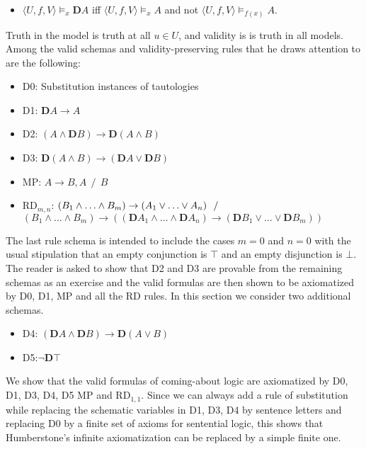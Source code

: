 \documentclass[
  11pt,
  letterpaper,
  DIV=11,
  numbers=noendperiod,
  twoside]{scrartcl}
\providecommand{\tightlist}{%
  \setlength{\itemsep}{0pt}\setlength{\parskip}{0pt}}\usepackage{longtable,booktabs,array}
\begin{document}
\begin{itemize}
\tightlist
\item
  \(\langle U,f,V\rangle \models _x \mathbf{D}A\) iff
  \(\langle U,f,V\!\rangle \models _x A\) and not
  \(\langle U,f,V\!\rangle \models _{f(x)} A\).
\end{itemize}

Truth in the model is truth at all \(u{\in}U\), and validity is is truth
in all models. Among the valid schemas and validity-preserving rules
that he draws attention to are the following:

\begin{itemize}
\tightlist
\item
  D0: Substitution instances of tautologies
\item
  D1: \(\mathbf{D}A\rightarrow A\)
\item
  D2: \((A\wedge\mathbf{D}B) \rightarrow \mathbf{D}(A\wedge B)\)
\item
  D3:
  \(\mathbf{D}(A\wedge B) \rightarrow (\mathbf{D}A\vee \mathbf{D}B)\)
\item
  MP: \(A\rightarrow B, A ~~/~~ B\)
\item
  RD\(_{m,n}\):
  \((B_1 \wedge {\ldots}\wedge B_m) \rightarrow (A_1\vee {\ldots}\vee A_n) ~~/ \\\)\((B_1 \wedge {\ldots}\wedge B_m) \rightarrow ((\mathbf{D}A_1\wedge {\ldots}\wedge \mathbf{D}A_n) \rightarrow (\mathbf{D}B_1 \vee {\ldots}\vee \mathbf{D}B_m))\)
\end{itemize}

The last rule schema is intended to include the cases \(m=0\) and
\(n=0\) with the usual stipulation that an empty conjunction is \(\top\)
and an empty disjunction is \(\bot\). The reader is asked to show that
D2 and D3 are provable from the remaining schemas as an exercise and the
valid formulas are then shown to be axiomatized by D0, D1, MP and all
the RD rules. In this section we consider two additional schemas.

\begin{itemize}
\tightlist
\item
  D4:
  \((\mathbf{D}A\wedge \mathbf{D}B) \rightarrow \mathbf{D}(A\vee B)\)
\item
  D5:\(\neg \mathbf{D}\top\)
\end{itemize}

We show that the valid formulas of coming-about logic are axiomatized by
D0, D1, D3, D4, D5 MP and RD\(_{1,1}\). Since we can always add a rule
of substitution while replacing the schematic variables in D1, D3, D4 by
sentence letters and replacing D0 by a finite set of axioms for
sentential logic, this shows that Humberstone's infinite axiomatization
can be replaced by a simple finite one.
\end{document}
